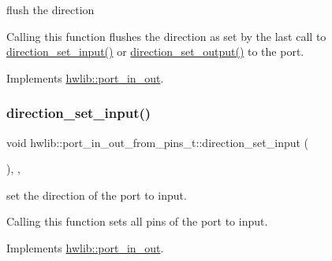 flush the direction

Calling this function flushes the direction as set by the last call to \hyperlink{classhwlib_1_1port__in__out__from__pins__t_acdd41d7b0788c259ef2a7a62ea9476ea}{direction\+\_\+set\+\_\+input()} or \hyperlink{classhwlib_1_1port__in__out__from__pins__t_a2fb1966c582d06ecaa8ba67ab6fe2be0}{direction\+\_\+set\+\_\+output()} to the port. 

Implements \hyperlink{classhwlib_1_1port__in__out_a431b79eee48a21a93978bfdf6620f800}{hwlib\+::port\+\_\+in\+\_\+out}.

\mbox{\label{classhwlib_1_1port__in__out__from__pins__t_acdd41d7b0788c259ef2a7a62ea9476ea}} 
\subsubsection{\texorpdfstring{direction\+\_\+set\+\_\+input()}{direction\_set\_input()}}
{\footnotesize\ttfamily void hwlib\+::port\+\_\+in\+\_\+out\+\_\+from\+\_\+pins\+\_\+t\+::direction\+\_\+set\+\_\+input (\begin{DoxyParamCaption}{ }\end{DoxyParamCaption})\hspace{0.3cm}{\ttfamily [inline]}, {\ttfamily [override]}, {\ttfamily [virtual]}}

set the direction of the port to input.

Calling this function sets all pins of the port to input. 

Implements \hyperlink{classhwlib_1_1port__in__out_ac7a9611410ddb9fd5d8e2dd15bff0a3f}{hwlib\+::port\+\_\+in\+\_\+out}.

\mbox{\label{classhwlib_1_1port__in__out__from__pins__t_a2fb1966c582d06ecaa8ba67ab6fe2be0}} 
